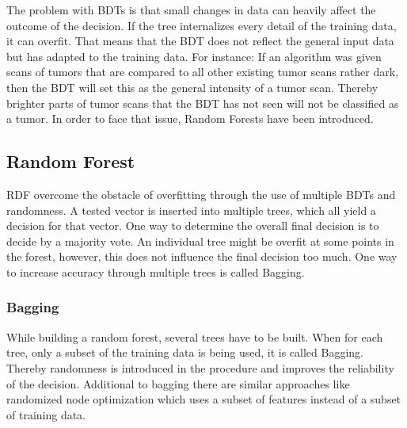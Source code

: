 \documentclass[
12pt,
headsepline,
bibliography=totoc,
twoside=semi,
fleqn
]{scrartcl}
\begin{document}
 The problem with BDTs is that small changes in data can heavily affect the outcome of the decision. If the tree internalizes every detail of the training data, it can overfit. That means that the BDT does not reflect the general input data but has adapted to the training data. For instance: If an algorithm was given scans of tumors that are compared to all other existing tumor scans rather dark, then the BDT will set this as the general intensity of a tumor scan. Thereby brighter parts of tumor scans that the BDT has not seen will not be classified as a tumor. In order to face that issue, Random Forests have been introduced. 

 \subsection{Random Forest\label{sec:sec2-2}}
   RDF overcome the obstacle of overfitting through the use of multiple BDTs and randomness. A tested vector is inserted into multiple trees, which all yield a decision for that vector. One way to determine the overall final decision is to decide by a majority vote. An individual tree might be overfit at some points in the forest, however, this does not influence the final decision too much. One way to increase accuracy through multiple trees is called Bagging.

 \subsubsection{Bagging\label{sec:sec2-2-1}}
 While building a random forest, several trees have to be built. When for each tree, only a subset of the training data is being used, it is called Bagging. Thereby randomness is introduced in the procedure and improves the reliability of the decision. Additional to bagging there are similar approaches like randomized node optimization which uses a subset of features instead of a subset of training data.  
 
\end{document}
